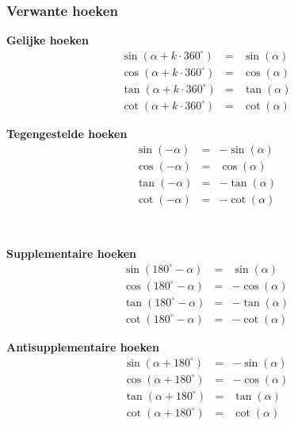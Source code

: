 \subsubsection{Verwante hoeken}
\vspace{0.2cm}
\begin{minipage}[b]{0.5\linewidth}
\textbf{Gelijke hoeken}
\begin{eqnarray*}
\sin(\alpha + k\cdot 360^\circ) &=& \sin(\alpha)\\
\cos(\alpha + k\cdot 360^\circ) &=& \cos(\alpha)\\
\tan(\alpha + k\cdot 360^\circ) &=& \tan(\alpha)\\
\cot(\alpha + k\cdot 360^\circ) &=& \cot(\alpha)
\end{eqnarray*}
\end{minipage}
\hspace{0.5cm}
\begin{minipage}[b]{0.5\linewidth}
\textbf{Tegengestelde hoeken}
\begin{eqnarray*}
\sin(-\alpha) &=& -\sin(\alpha)\\
\cos(-\alpha) &=& \cos(\alpha)\\
\tan(-\alpha) &=& -\tan(\alpha)\\
\cot(-\alpha) &=& -\cot(\alpha)
\end{eqnarray*}
\end{minipage}
\ \\
\begin{minipage}[b]{0.5\linewidth}
\textbf{Supplementaire hoeken}
\begin{eqnarray*}
\sin(180^\circ-\alpha) &=& \sin(\alpha)\\
\cos(180^\circ-\alpha) &=& -\cos(\alpha)\\
\tan(180^\circ-\alpha) &=& -\tan(\alpha)\\
\cot(180^\circ-\alpha) &=& -\cot(\alpha)
\end{eqnarray*}
\end{minipage}
\hspace{0.5cm}
\begin{minipage}[b]{0.5\linewidth}
\textbf{Antisupplementaire hoeken}
\begin{eqnarray*}
\sin(\alpha+180^\circ) &=& -\sin(\alpha)\\
\cos(\alpha+180^\circ) &=& -\cos(\alpha)\\
\tan(\alpha+180^\circ) &=& \tan(\alpha)\\
\cot(\alpha+180^\circ) &=& \cot(\alpha)
\end{eqnarray*}
\end{minipage}
